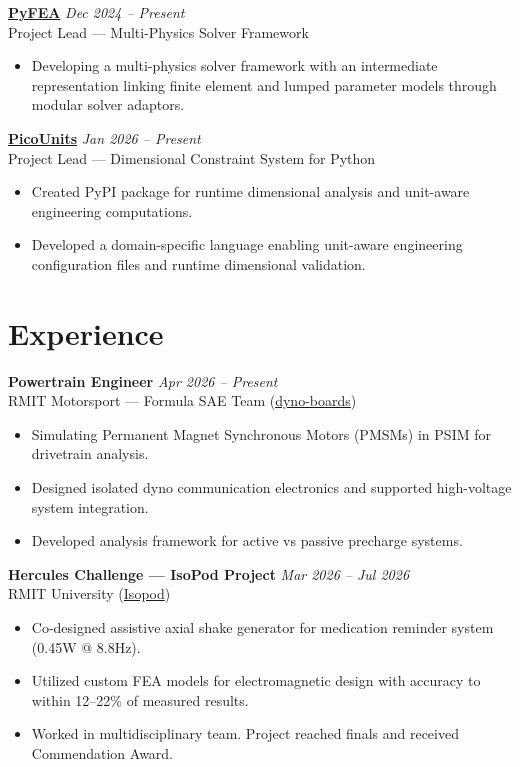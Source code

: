 \documentclass[11pt,a4paper]{article}
\begin{document}
\noindent\textbf{\href{https://github.com/wgbowley/PyFEA}{PyFEA}} \hfill \textit{Dec 2024 -- Present} \\
Project Lead — Multi-Physics Solver Framework
\begin{itemize}[leftmargin=*, noitemsep]
    \item Developing a multi-physics solver framework with an intermediate representation linking finite element and lumped parameter models through modular solver adaptors.
\end{itemize}

\noindent\textbf{\href{https://github.com/wgbowley/PicoUnits}{PicoUnits}} \hfill \textit{Jan 2026 -- Present} \\
Project Lead — Dimensional Constraint System for Python
\begin{itemize}[leftmargin=*, noitemsep]
    \item Created PyPI package for runtime dimensional analysis and unit-aware engineering computations.
    \item Developed a domain-specific language enabling unit-aware engineering configuration files and runtime dimensional validation.
\end{itemize}

\section*{Experience}

\noindent\textbf{Powertrain Engineer} \hfill \textit{Apr 2026 -- Present} \\
RMIT Motorsport — Formula SAE Team (\href{https://github.com/rmit-wgbowley/dyno-boards}{dyno-boards})
\begin{itemize}[leftmargin=*, noitemsep]
    \item Simulating Permanent Magnet Synchronous Motors (PMSMs) in PSIM for drivetrain analysis.
    \item Designed isolated dyno communication electronics and supported high-voltage system integration.
    \item Developed analysis framework for active vs passive precharge systems.
\end{itemize}

\noindent\textbf{Hercules Challenge — IsoPod Project} \hfill \textit{Mar 2026 -- Jul 2026} \\
RMIT University (\href{https://github.com/rmit-wgbowley/Isopod}{Isopod})
\begin{itemize}[leftmargin=*, noitemsep]
    \item Co-designed assistive axial shake generator for medication reminder system (0.45W @ 8.8Hz).
    \item Utilized custom FEA models for electromagnetic design with accuracy to within 12--22\% of measured results.
    \item Worked in multidisciplinary team. Project reached finals and received Commendation Award.
\end{itemize}
\end{document}
